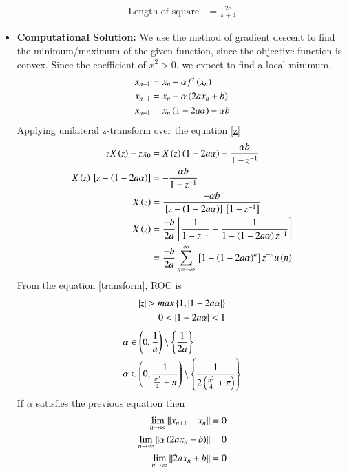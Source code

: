 \documentclass[journal]{IEEEtran}
\numberwithin{equation}{enumi}
\numberwithin{figure}{enumi}
\begin{document}
\begin{itemize}
\begin{align}
        \text{Length of square} &= \frac{28}{\pi + 4}
    \end{align}
    \item \textbf{Computational Solution:}
    We use the method of gradient descent to find the minimum/maximum of the given function, since the objective function is convex. Since the coefficient of $x^2 > 0$, we expect to find a local minimum.
    \begin{align}
        x_{n + 1} &= x_n - \alpha f^{\prime}\left(x_n\right)\\
        x_{n + 1} &= x_n - \alpha \left(2ax_n + b\right)\\
        x_{n + 1} &= x_n \left(1 - 2a\alpha\right) - \alpha b \label{z}
    \end{align}
    Applying unilateral z-transform over the equation \eqref{z}
    \begin{align}
        zX\left(z\right) - zx_0 &= X\left(z\right)\left(1 - 2a\alpha\right) - \frac{\alpha b}{1 - z^{-1}}\\
        X\left(z\right){}\left[z - \left(1 - 2a\alpha\right)\right] &= - \frac{\alpha b}{1 - z^{-1}} \\
        X\left(z\right) &= \frac{-\alpha b}{{}\left[z - \left(1 - 2a\alpha\right)\right] {}\left[1 - z^{-1}\right]}\\
        X\left(z\right) &= \frac{-b}{2a} {}\left[\frac{1}{1 - z^{-1}} - \frac{1}{1 - \left(1 - 2a\alpha\right)z^{-1}}\right]\\
        &= \frac{-b}{2a}\sum_{n = -\infty}^{\infty} {{}\left[1 - \left(1 - 2a\alpha\right)^n\right]z^{-n}}u\left(n\right) \label{transform}
    \end{align}
    From the equation \eqref{transform}, ROC is 
    \begin{align}
        \left\vert z\right\vert > max\left\{1, \left\vert1 - 2a\alpha\right\vert\right\}\\
        0 < \left\vert1 - 2a\alpha\right\vert < 1
    \end{align}
    \begin{align}
        \alpha &\in \left(0, \frac{1}{a}\right)\setminus \left\{\frac{1}{2a}\right\}\\
        \alpha &\in \left(0, \frac{1}{\frac{\pi^2}{4} + \pi}\right) \setminus \left\{\frac{1}{2\left(\frac{\pi^2}{4} + \pi\right)}\right\}
    \end{align}
    If $\alpha$ satisfies the previous equation then 
    \begin{align}
        \lim_{n \to \infty}{\norm{x_{n+1} - x_n}} &= 0\\
        \lim_{n \to \infty}{\norm{\alpha\brak{2ax_n + b}}} &= 0\\
        \lim_{n \to \infty}{\norm{2ax_n + b}} &= 0\\

\end{align}
\end{itemize}
\end{document}
